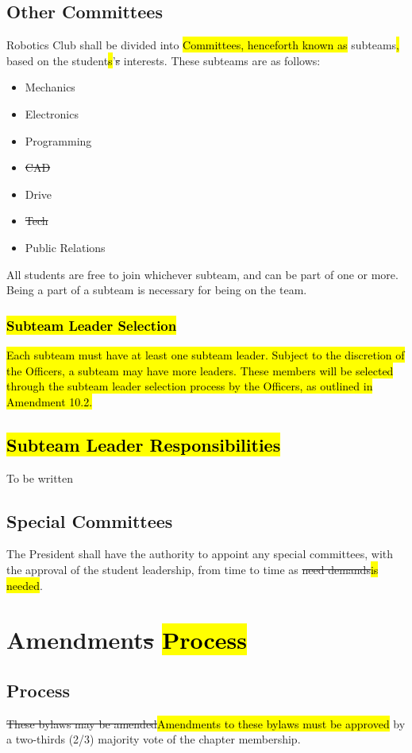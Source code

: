 \documentclass[12pt, a4paper]{article}
\begin{document}
\subsection{Other Committees}
Robotics Club shall be divided into \hl{Committees, henceforth known as }subteams\hl{,} based on the student\hl{s}’\st{s} interests. These subteams are as follows:
\begin{itemize}
\item Mechanics
\item Electronics
\item Programming
\item \st{CAD}
\item Drive
\item \st{Tech}
\item Public Relations
\end{itemize}
All students are free to join whichever subteam, and can be part of one or more. Being a part of a subteam is necessary for being on the team.

\subsubsection{\hl{Subteam Leader Selection}}
\hl{Each subteam must have at least one subteam leader. 
Subject to the discretion of the Officers, a subteam may have more leaders. 
These members will be selected through the subteam leader selection process by the Officers, as outlined in Amendment 10.2.}

\subsection{\hl{Subteam Leader Responsibilities}}
To be written

\subsection{Special Committees}
The President shall have the authority to appoint any special committees, with the approval of the student leadership, from time to time as \st{need demands}\hl{is needed}.

\section{Amendment\st{s} \hl{Process}}
\subsection{Process}
\st{These bylaws may be amended}\hl{Amendments to these bylaws must be approved} by a two-thirds (2/3) majority vote of the chapter membership.
\end{document}
